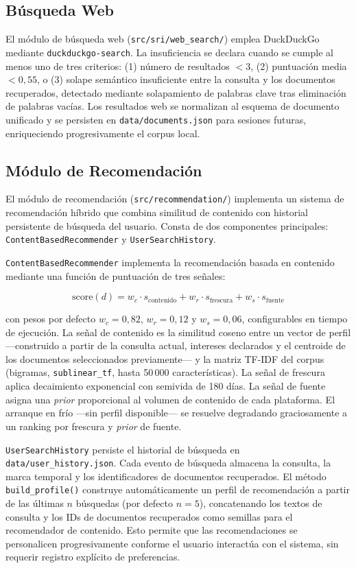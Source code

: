 \documentclass[runningheads,a4paper]{llncs}
\begin{document}
\subsection{Búsqueda Web}

El módulo de búsqueda web (\texttt{src/sri/web\_search/}) emplea DuckDuckGo mediante \texttt{duckduckgo-search}. La insuficiencia se declara cuando se cumple al menos uno de tres criterios: (1) número de resultados $< 3$, (2) puntuación media $< 0{,}55$, o (3) solape semántico insuficiente entre la consulta y los documentos recuperados, detectado mediante solapamiento de palabras clave tras eliminación de palabras vacías. Los resultados web se normalizan al esquema de documento unificado y se persisten en \texttt{data/documents.json} para sesiones futuras, enriqueciendo progresivamente el corpus local.



\subsection{Módulo de Recomendación}

El módulo de recomendación (\texttt{src/recommendation/}) implementa un sistema de recomendación híbrido que combina similitud de contenido con historial persistente de búsqueda del usuario. Consta de dos componentes principales: \texttt{ContentBasedRecommender} y \texttt{UserSearchHistory}.

\texttt{ContentBasedRecommender} implementa la recomendación basada en contenido mediante una función de puntuación de tres señales:

$$\text{score}(d) = w_c \cdot s_\text{contenido} + w_r \cdot s_\text{frescura} + w_s \cdot s_\text{fuente}$$

con pesos por defecto $w_c = 0{,}82$, $w_r = 0{,}12$ y $w_s = 0{,}06$, configurables en tiempo de ejecución. La señal de contenido es la similitud coseno entre un vector de perfil —construido a partir de la consulta actual, intereses declarados y el centroide de los documentos seleccionados previamente— y la matriz TF-IDF del corpus (bigramas, \texttt{sublinear\_tf}, hasta 50\,000 características). La señal de frescura aplica decaimiento exponencial con semivida de 180 días. La señal de fuente asigna una \emph{prior} proporcional al volumen de contenido de cada plataforma. El arranque en frío —sin perfil disponible— se resuelve degradando graciosamente a un ranking por frescura y \emph{prior} de fuente.

\texttt{UserSearchHistory} persiste el historial de búsqueda en \texttt{data/user\_history.json}. Cada evento de búsqueda almacena la consulta, la marca temporal y los identificadores de documentos recuperados. El método \texttt{build\_profile()} construye automáticamente un perfil de recomendación a partir de las últimas $n$ búsquedas (por defecto $n=5$), concatenando los textos de consulta y los IDs de documentos recuperados como semillas para el recomendador de contenido. Esto permite que las recomendaciones se personalicen progresivamente conforme el usuario interactúa con el sistema, sin requerir registro explícito de preferencias.
\end{document}
